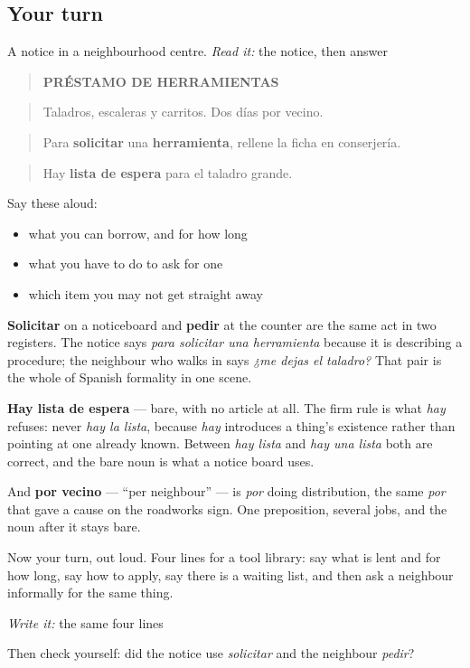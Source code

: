 \subsection*{Your turn}
A notice in a neighbourhood centre. \emph{Read it:} the notice, then answer

\begin{quote}
\textbf{PRÉSTAMO DE HERRAMIENTAS}
\end{quote}

\begin{quote}
Taladros, escaleras y carritos. Dos días por vecino.
\end{quote}

\begin{quote}
Para \textbf{solicitar} una \textbf{herramienta}, rellene la ficha en conserjería.
\end{quote}

\begin{quote}
Hay \textbf{lista de espera} para el taladro grande.
\end{quote}

Say these aloud:

\begin{itemize}
\raggedright
  \item what you can borrow, and for how long
  \item what you have to do to ask for one
  \item which item you may not get straight away
\end{itemize}

\begin{culture}
\textbf{Solicitar} on a noticeboard and \textbf{pedir} at the counter are the same act in two registers. The notice says \emph{para solicitar una herramienta} because it is describing a procedure; the neighbour who walks in says \emph{¿me dejas el taladro?} That pair is the whole of Spanish formality in one scene.

\textbf{Hay lista de espera} — bare, with no article at all. The firm rule is what \emph{hay} refuses: never \emph{hay la lista}, because \emph{hay} introduces a thing's existence rather than pointing at one already known. Between \emph{hay lista} and \emph{hay una lista} both are correct, and the bare noun is what a notice board uses.

And \textbf{por vecino} — \textquotedblleft{}per neighbour\textquotedblright{} — is \emph{por} doing distribution, the same \emph{por} that gave a cause on the roadworks sign. One preposition, several jobs, and the noun after it stays bare.
\end{culture}

\begin{tcolorbox}[breakable,colback=teal!4,colframe=teal!35!black,title={Before you move on}]
Now your turn, out loud. Four lines for a tool library: say what is lent and for how long, say how to apply, say there is a waiting list, and then ask a neighbour informally for the same thing.

\emph{Write it:} the same four lines

Then check yourself: did the notice use \emph{solicitar} and the neighbour \emph{pedir}?
\end{tcolorbox}
